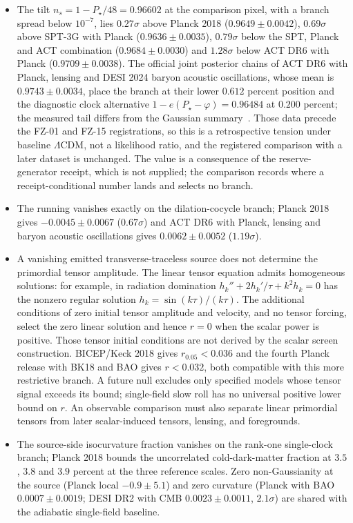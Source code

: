 \documentclass[11pt]{article}
\theoremstyle{remark}
\begin{document}
\begin{itemize}[leftmargin=2em]
\item The tilt \(n_s=1-P_\star/48=0.96602\) at the comparison pixel, with
a branch spread below \(10^{-7}\), lies \(0.27\sigma\) above Planck 2018
(\(0.9649\pm0.0042\)), \(0.69\sigma\) above SPT-3G with Planck
(\(0.9636\pm0.0035\)), \(0.79\sigma\) below the SPT, Planck and ACT
combination (\(0.9684\pm0.0030\)) and \(1.28\sigma\) below ACT DR6 with
Planck (\(0.9709\pm0.0038\)). The official joint posterior chains of ACT DR6
with Planck, lensing and DESI 2024 baryon acoustic oscillations, whose mean
is \(0.9743\pm0.0034\), place the branch at their lower \(0.612\) percent
position and the diagnostic clock alternative
\(1-e(P_\star-\varphi)=0.96484\) at \(0.200\) percent; the measured tail
differs from the Gaussian summary~\cite{act2025,ophpublicdata}. Those data
precede the FZ-01 and FZ-15 registrations, so this is a retrospective
tension under baseline \(\Lambda\)CDM, not a likelihood ratio, and the
registered comparison with a later dataset is unchanged. The value is a
consequence of the reserve-generator receipt, which is not supplied; the
comparison records where a receipt-conditional number lands and selects no
branch.
\item The running vanishes exactly on the dilation-cocycle branch; Planck
2018 gives \(-0.0045\pm0.0067\) (\(0.67\sigma\)) and ACT DR6 with Planck,
lensing and baryon acoustic oscillations gives \(0.0062\pm0.0052\)
(\(1.19\sigma\)).
\item A vanishing emitted transverse-traceless source does not determine
the primordial tensor amplitude. The linear tensor equation admits
homogeneous solutions: for example, in radiation domination
\(h_k''+2h_k'/\tau+k^2h_k=0\) has the nonzero regular solution
\(h_k=\sin(k\tau)/(k\tau)\). The additional conditions of zero initial
tensor amplitude and velocity, and no tensor forcing, select the zero
linear solution and hence \(r=0\) when the scalar power is positive.
Those tensor initial conditions are not derived by the scalar screen
construction. BICEP/Keck 2018 gives \(r_{0.05}<0.036\) and the fourth
Planck release with BK18 and BAO gives \(r<0.032\), both compatible with
this more restrictive branch. A future null excludes only specified models
whose tensor signal exceeds its bound; single-field slow roll has no
universal positive lower bound on \(r\). An observable comparison must also
separate linear primordial tensors from later scalar-induced tensors,
lensing, and foregrounds.
\item The source-side isocurvature fraction vanishes on the rank-one
single-clock branch; Planck 2018 bounds the uncorrelated cold-dark-matter
fraction at \(3.5\), \(3.8\) and \(3.9\) percent at the three reference
scales. Zero non-Gaussianity at the source (Planck local
\(-0.9\pm5.1\)) and zero curvature (Planck with BAO \(0.0007\pm0.0019\);
DESI DR2 with CMB \(0.0023\pm0.0011\), \(2.1\sigma\)) are shared with the
adiabatic single-field baseline.
\end{itemize}
\end{document}
